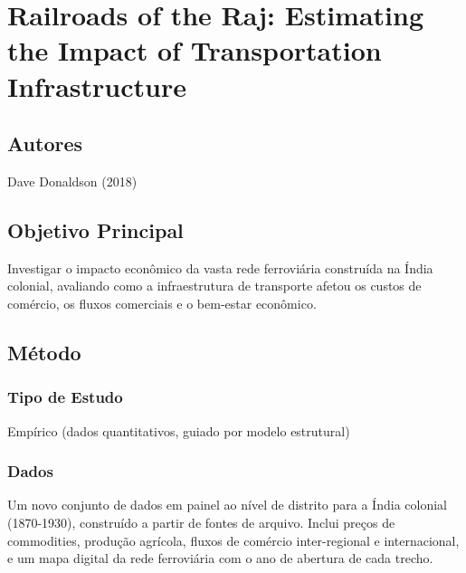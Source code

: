 \documentclass[12pt]{article}
\begin{document}
\section{Railroads of the Raj: Estimating the Impact of Transportation Infrastructure}

\subsection*{Autores}
Dave Donaldson (2018)

\subsection*{Objetivo Principal}
Investigar o impacto econômico da vasta rede ferroviária construída na Índia colonial, avaliando como a infraestrutura de transporte afetou os custos de comércio, os fluxos comerciais e o bem-estar econômico.

\subsection*{Método}

\subsubsection*{Tipo de Estudo}
Empírico (dados quantitativos, guiado por modelo estrutural)

\subsubsection*{Dados}
Um novo conjunto de dados em painel ao nível de distrito para a Índia colonial (1870-1930), construído a partir de fontes de arquivo. Inclui preços de commodities, produção agrícola, fluxos de comércio inter-regional e internacional, e um mapa digital da rede ferroviária com o ano de abertura de cada trecho.
\end{document}
